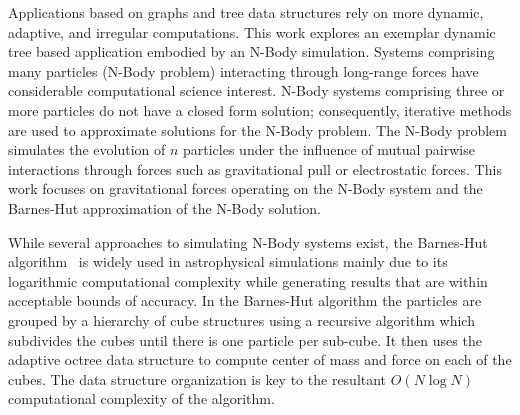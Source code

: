 \documentclass[floatfix]{revtex4}
\begin{document}
Applications based on graphs and tree data structures rely on more dynamic, 
adaptive, and irregular computations. This work explores an exemplar dynamic tree 
based application embodied by an N-Body simulation. Systems comprising many particles 
(N-Body problem) interacting through long-range forces have considerable computational
science interest. N-Body systems comprising three or more particles do not have a closed 
form solution; consequently, iterative methods are used to approximate solutions 
for the N-Body problem. The N-Body problem simulates the evolution of $n$ particles 
under the influence of mutual pairwise interactions through forces such as 
gravitational pull or electrostatic forces. This work focuses on gravitational 
forces operating on the N-Body system and the Barnes-Hut approximation of the N-Body solution.

While several approaches to simulating N-Body systems exist, the Barnes-Hut 
algorithm~\cite{barneshut} is widely used in astrophysical simulations 
mainly due to its logarithmic computational complexity while generating results that are 
within acceptable bounds of accuracy. In the Barnes-Hut algorithm the particles
are grouped by a hierarchy of cube structures using a recursive algorithm which subdivides the
cubes until there is one particle per sub-cube. It then uses the adaptive octree
data structure to compute center of mass and force on each of the cubes. The data
structure organization is key to the resultant $O(N\log{N})$ computational complexity
of the algorithm.
\end{document}
